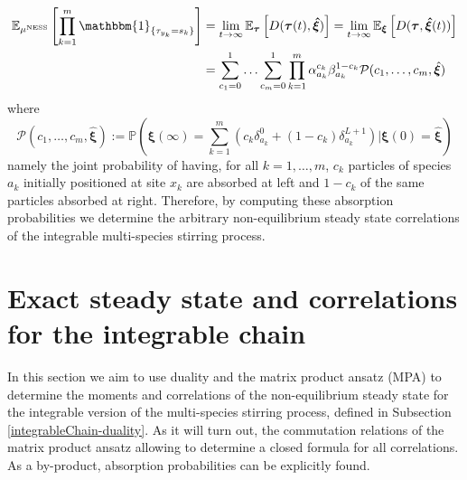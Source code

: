 \documentclass[10pt]{article}
\numberwithin{equation}{section}
\numberwithin{equation}{subsection}
\begin{document}
\begin{equation}\label{CorrelationByABS-prob}
	\begin{split}
\mathbb{E}_{\mu^{\text{NESS}}}\left[\prod_{k=1}^{m}\mathbbm{1}_{\{\tau_{y_{k}}=s_{k}\}}\right]&=\lim_{t\to \infty}\mathbb{E}_{\bm{\tau}}\left[D(\bm{\tau}(t),\bm{\hat{\xi}})\right]=\lim_{t\to \infty}\mathbb{E}_{\bm{\xi}}\left[D(\bm{\tau},\bm{\hat{\xi}}(t))\right]
	\\&=\sum_{c_{1}=0}^{1}\ldots \sum_{c_{m}=0}^{1}\prod_{k=1}^{m}\alpha_{a_{k}}^{c_{k}}\beta_{a_{k}}^{1-c_{k}}\mathcal{P}(c_{1},\ldots,c_{m},\hat{\bm{\xi}})
\end{split}
\end{equation}
where
\begin{equation}\label{absProbabilitiesIntegrable}
	\mathcal{P}(c_{1},\ldots,c_{m},\hat{\bm{\xi}}):=\mathbb{P}\left(\bm{\xi}(\infty)=\sum_{k=1}^{m}\left(c_{k}\delta^{0}_{a_k}+(1-c_{k})\delta^{L+1}_{a_k}\right)\lvert \bm{\xi}(0)=\hat{\bm{\xi}}\right)
\end{equation}
 namely the joint probability of having, for all $k=1,\ldots,m$, $c_{k}$ particles of species $a_{k}$ initially positioned at site $x_{k}$ are absorbed at left and $1-c_{k}$ of the same particles absorbed at right. Therefore, by computing these absorption probabilities we determine the arbitrary non-equilibrium steady state correlations of the integrable multi-species stirring process. 






\section{Exact steady state and correlations for the integrable chain}\label{sectionIntegrabiliy}
In this section we aim to use duality and the matrix product ansatz (MPA) to determine the moments and correlations of the non-equilibrium steady state for the integrable version of the multi-species stirring process, defined in Subsection \ref{integrableChain-duality}. As it will turn out, the commutation relations of the matrix product ansatz allowing to determine a closed formula for all correlations. As a by-product, absorption probabilities can be explicitly found.%
\end{document}
